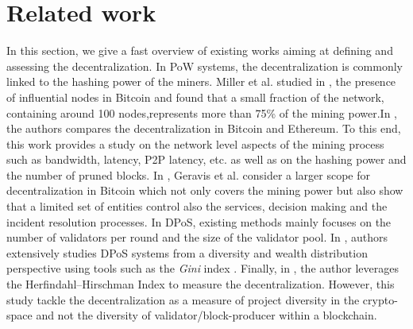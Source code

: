 \documentclass{article}
\begin{document}
\section{Related work}
In this section, we give a fast overview of existing works aiming at defining and assessing the decentralization. In PoW systems, the decentralization is commonly linked to the hashing power of the miners. Miller et al. studied in \cite{miller2015discovering}, the presence of influential nodes in Bitcoin and found that a small fraction of the network, containing around 100 nodes,represents more than 75\% of the mining power.In \cite{gencer2018decentralization}, the authors compares the decentralization in Bitcoin and Ethereum. To this end, this work provides a study on the network level aspects of the mining process such as bandwidth, latency, P2P latency, etc. as well as on the hashing power and the number of pruned blocks.   In \cite{gervais2014bitcoin}, Geravis et al. consider a larger scope for decentralization in Bitcoin which not only covers the mining power but also show that a limited set of entities control also the services, decision making and the incident resolution  processes. In DPoS, existing methods mainly focuses on the number of validators per round and the size of the validator pool. In \cite{kwon2019impossibility}, authors extensively studies DPoS systems from a diversity and wealth distribution perspective using tools such as the \textit{Gini} index . Finally, in \cite{DecentralizationCrypto}, the author leverages the Herfindahl–Hirschman Index\cite{rhoades1993herfindahl} to measure the decentralization. However, this study tackle the decentralization as a measure of project diversity in the crypto-space and not the diversity of validator/block-producer within a blockchain.
\end{document}
